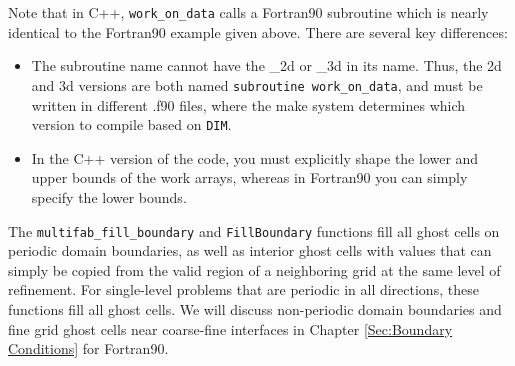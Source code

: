 Note that in C++, {\tt work\_on\_data} calls a Fortran90 subroutine which is nearly
identical to the Fortran90 example given above.  There are several key differences:
\begin{itemize}
\item The subroutine name cannot have the \_2d or \_3d in its name.
      Thus, the 2d and 3d versions
      are both named {\tt subroutine work\_on\_data}, and must be written in
      different .f90 files, where the make system determines which version to compile
      based on {\tt DIM}.
\item In the C++ version of the code, you must explicitly shape the lower and upper
      bounds of the work arrays, whereas in Fortran90 you can simply specify the lower
      bounds.
\end{itemize} 

The {\tt multifab\_fill\_boundary} and {\tt FillBoundary} functions 
fill all ghost cells on periodic domain boundaries, as well as interior
ghost cells with values that can simply be copied from the valid region of a neighboring
grid at the same level of refinement.  For single-level problems that are periodic
in all directions, these functions fill all ghost cells.  We will discuss
non-periodic domain boundaries and fine grid ghost cells near coarse-fine interfaces
in Chapter \ref{Sec:Boundary Conditions} for Fortran90.

